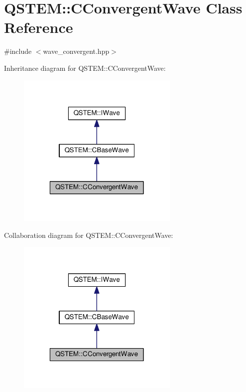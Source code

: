 \hypertarget{class_q_s_t_e_m_1_1_c_convergent_wave}{\section{Q\-S\-T\-E\-M\-:\-:C\-Convergent\-Wave Class Reference}
\label{class_q_s_t_e_m_1_1_c_convergent_wave}
}


{\ttfamily \#include $<$wave\-\_\-convergent.\-hpp$>$}



Inheritance diagram for Q\-S\-T\-E\-M\-:\-:C\-Convergent\-Wave\-:
\nopagebreak
\begin{figure}[H]
\begin{center}
\leavevmode
\includegraphics[width=220pt]{class_q_s_t_e_m_1_1_c_convergent_wave__inherit__graph}
\end{center}
\end{figure}


Collaboration diagram for Q\-S\-T\-E\-M\-:\-:C\-Convergent\-Wave\-:
\nopagebreak
\begin{figure}[H]
\begin{center}
\leavevmode
\includegraphics[width=220pt]{class_q_s_t_e_m_1_1_c_convergent_wave__coll__graph}
\end{center}
\end{figure}
